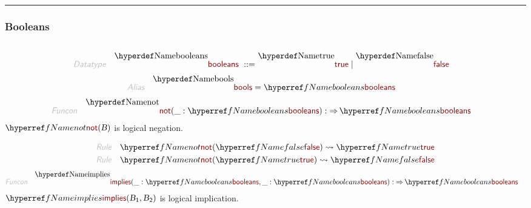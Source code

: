 

\begin{center}
\rule{3in}{0.4pt}
\end{center}

\subsubsection{Booleans}\hypertarget{booleans}{}\label{booleans}

\begin{align*}
  [ \
  \KEY{Datatype} \quad & \NAMEREF{booleans} \\
  \KEY{Alias} \quad & \NAMEREF{bools} \\
  \KEY{Funcon} \quad & \NAMEREF{true} \\
  \KEY{Funcon} \quad & \NAMEREF{false} \\
  \KEY{Funcon} \quad & \NAMEREF{not} \\
  \KEY{Funcon} \quad & \NAMEREF{implies} \\
  \KEY{Funcon} \quad & \NAMEREF{and} \\
  \KEY{Funcon} \quad & \NAMEREF{or} \\
  \KEY{Funcon} \quad & \NAMEREF{exclusive-or} \\
  \KEY{Alias} \quad & \NAMEREF{xor}
  \ ]
\end{align*}
\begin{align*}
  \KEY{Datatype} \quad 
  \NAMEDECL{booleans} 
  \ ::= \ &
  \NAMEDECL{true} \mid \NAMEDECL{false}
\end{align*}
\begin{align*}
  \KEY{Alias} \quad
  & \NAMEDECL{bools} = \NAMEREF{booleans}
\end{align*}
\begin{align*}
  \KEY{Funcon} \quad
  & \NAMEDECL{not}(
                       \_ : \NAMEREF{booleans}) 
    :  \TO \NAMEREF{booleans} 
\end{align*}
$\SHADE{\NAMEREF{not}
           (  \VAR{B} )}$   is logical negation.

\begin{align*}
  \KEY{Rule} \quad
    & \NAMEREF{not}
        (  \NAMEREF{false} ) \leadsto 
        \NAMEREF{true}
\\
  \KEY{Rule} \quad
    & \NAMEREF{not}
        (  \NAMEREF{true} ) \leadsto 
        \NAMEREF{false}
\end{align*}
\begin{align*}
  \KEY{Funcon} \quad
  & \NAMEDECL{implies}(
                       \_ : \NAMEREF{booleans}, \_ : \NAMEREF{booleans}) 
    :  \TO \NAMEREF{booleans} 
\end{align*}
$\SHADE{\NAMEREF{implies}
           (  \VAR{B}\SUB{1}, 
                  \VAR{B}\SUB{2} )}$ is logical implication.

